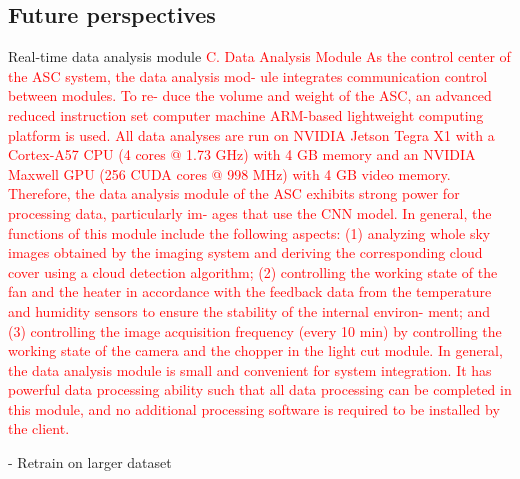 \documentclass[amt, article]{copernicus}
\begin{document}
\subsection{Future perspectives}


Real-time data analysis module
\textcolor{red}{C. Data Analysis Module
As the control center of the ASC system, the data analysis mod-
ule integrates communication control between modules. To re-
duce the volume and weight of the ASC, an advanced reduced
instruction set computer machine ARM-based lightweight
computing platform is used. All data analyses are run on
NVIDIA Jetson Tegra X1 with a Cortex-A57 CPU (4 cores
@ 1.73 GHz) with 4 GB memory and an NVIDIA
Maxwell GPU (256 CUDA cores @ 998 MHz) with 4 GB
video memory. Therefore, the data analysis module of the
ASC exhibits strong power for processing data, particularly im-
ages that use the CNN model. In general, the functions of this
module include the following aspects:
(1) analyzing whole sky images obtained by the imaging
system and deriving the corresponding cloud cover using a
cloud detection algorithm;
(2) controlling the working state of the fan and the heater in
accordance with the feedback data from the temperature and
humidity sensors to ensure the stability of the internal environ-
ment; and
(3) controlling the image acquisition frequency (every
10 min) by controlling the working state of the camera and
the chopper in the light cut module.
In general, the data analysis module is small and convenient
for system integration. It has powerful data processing ability
such that all data processing can be completed in this module,
and no additional processing software is required to be installed
by the client.}

- Retrain on larger dataset

\conclusions[Conclusion]%
\label{sec:conclusion}
\end{document}
